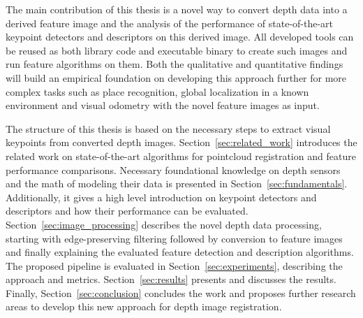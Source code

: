 The main contribution of this thesis is a novel way to convert depth data into a derived feature image and the analysis of the performance of state-of-the-art keypoint detectors and descriptors on this derived image.
All developed tools can be reused as both library code and executable binary to create such images and run \gls{feature} algorithms on them.
Both the qualitative and quantitative findings will build an empirical foundation on developing this approach further for more complex tasks such as place recognition, global localization in a known environment and visual odometry with the novel feature images as input.

The structure of this thesis is based on the necessary steps to extract visual keypoints from converted depth images.
Section~\ref{sec:related_work} introduces the related work on state-of-the-art algorithms for pointcloud registration and \gls{feature} performance comparisons.
Necessary foundational knowledge on depth sensors and the math of modeling their data is presented in Section~\ref{sec:fundamentals}.
Additionally, it gives a high level introduction on keypoint detectors and descriptors and how their performance can be evaluated.
Section~\ref{sec:image_processing} describes the novel depth data processing, starting with edge-preserving filtering followed by conversion to feature images and finally explaining the evaluated \gls{feature} detection and description algorithms.
The proposed pipeline is evaluated in Section~\ref{sec:experiments}, describing the approach and metrics.
Section~\ref{sec:results} presents and discusses the results.
Finally, Section~\ref{sec:conclusion} concludes the work and proposes further research areas to develop this new approach for depth image registration.
